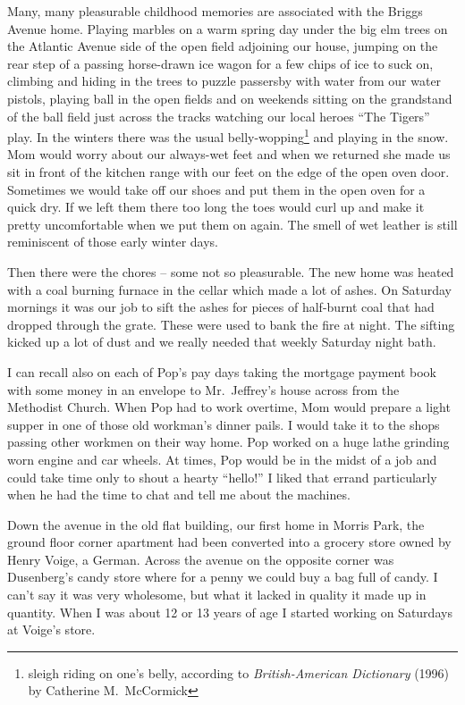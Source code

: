 \documentclass[12pt]{book}              %
\begin{document}
Many, many pleasurable childhood memories are associated with the Briggs Avenue home. Playing marbles on a warm spring day under the big elm trees on the Atlantic Avenue side of the open field adjoining our house, jumping on the rear step of a passing horse-drawn ice wagon for a few chips of ice to suck on, climbing and hiding in the trees to puzzle passersby with water from our water pistols, playing ball in the open fields and on weekends sitting on the grandstand of the ball field just across the tracks watching our local heroes ``The Tigers'' play. In the winters there was the usual belly-wopping\footnote{sleigh riding on one's belly, according to {\it British-American Dictionary} (1996) by Catherine M.~McCormick} and playing in the snow. Mom would worry about our always-wet feet and when we returned she made us sit in front of the kitchen range with our feet on the edge of the open oven door. Sometimes we would take off our shoes and put them in the open oven for a quick dry. If we left them there too long the toes would curl up and make it pretty uncomfortable when we put them on again. The smell of wet leather is still reminiscent of those early winter days. 

Then there were the chores -- some not so pleasurable. The new home was heated with a coal burning furnace in the cellar which made a lot of ashes. On Saturday mornings it was our job to sift the ashes for pieces of half-burnt coal that had dropped through the grate. These were used to bank the fire at night. The sifting kicked up a lot of dust and we really needed that weekly Saturday night bath.

I can recall also on each of Pop's pay days taking the mortgage payment book with some money in an envelope to Mr.~Jeffrey's house across from the Methodist Church. When Pop had to work overtime, Mom would prepare a light supper in one of those old workman's dinner pails. I would take it to the shops passing other workmen on their way home. Pop worked on a huge lathe grinding worn engine and car wheels. At times, Pop would be in the midst of a job and could take time only to shout a hearty ``hello!'' I liked that errand particularly when he had the time to chat and tell me about the machines. 

Down the avenue in the old flat building, our first home in Morris Park, the ground floor corner apartment had been converted into a grocery store owned by Henry Voige, a German. Across the avenue on the opposite corner was Dusenberg's candy store where for a penny we could buy a bag full of candy. I can't say it was very wholesome, but what it lacked in quality it made up in quantity. When I was about 12 or 13 years of age I started working on Saturdays at Voige's store.
\end{document}

